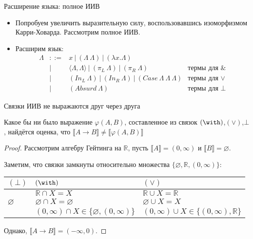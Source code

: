 \documentclass[aspectratio=169]{beamer}
\begin{document}
\begin{frame}{Расширение языка: полное ИИВ}
\begin{itemize}
\item Попробуем увеличить выразительную силу, воспользовавшись изоморфизмом Карри-Ховарда. Рассмотрим полное ИИВ.
\item Расширим язык: $$\begin{array}{rcll}\Lambda &::=& x\ |\ (\Lambda\ \Lambda)\ |\ (\lambda x.\Lambda)\ \\
& | & \langle\Lambda,\Lambda\rangle\ |\ (\pi_L\ \Lambda)\ |\ (\pi_R\ \Lambda) & \text{термы для }\&\\
& | & (In_L\ \Lambda)\ |\ (In_R\ \Lambda)\ |\ (Case\ \Lambda\ \Lambda\ \Lambda) & \text{термы для }\vee\\
& | &(Absurd\ \Lambda) & \text{термы для }\bot
\end{array}$$
\end{itemize}

\end{frame}

\begin{frame}{Связки ИИВ не выражаются друг через друга}
\begin{thm}
Какое бы ни было выражение $\varphi(A,B)$, составленное из связок $(\with)$,$(\vee)$,$\bot$, 
найдётся оценка, что $\llbracket A \rightarrow B\rrbracket \ne \llbracket \varphi(A,B) \rrbracket$\end{thm}

\begin{proof}
Рассмотрим алгебру Гейтинга на $\mathbb{R}$, пусть $\llbracket A\rrbracket = (0,\infty)$ 
и $\llbracket B\rrbracket = \varnothing$.

Заметим, что связки замкнуты относительно множества $\{\varnothing,\mathbb{R},(0,\infty)\}$:

\vspace{0.3cm}
\begin{tabular}{l|l|l}
$(\bot)$ & $(\with)$ & $(\vee)$ \\\hline
& $\mathbb{R} \cap X = X$ & $\mathbb{R} \cup X = \mathbb{R}$\\
$\varnothing$ & $\varnothing\cap X = \varnothing$ & $\varnothing\cup X = X$ \\
& $(0,\infty)\cap X \in \{\varnothing,(0,\infty)\}$ & $(0,\infty)\cup X \in \{(0,\infty),\mathbb{R}\}$
\end{tabular}

\vspace{0.3cm}
Однако, $\llbracket A \rightarrow B \rrbracket = (-\infty,0)$.
\end{proof}

\end{frame}
\end{document}
